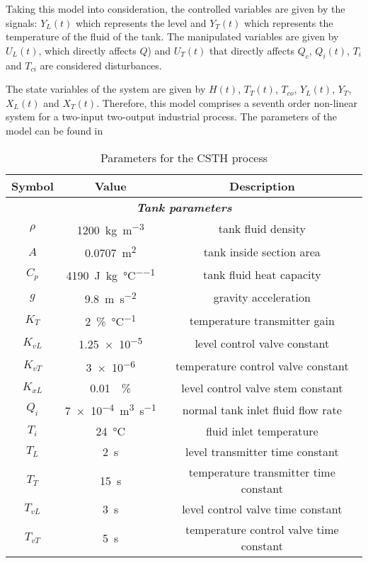 Taking this model into consideration, the controlled variables are given by the signals: $Y_L(t)$ which represents the level and $Y_T(t)$ which represents the temperature of the fluid of the tank. The manipulated variables are given by $U_L(t)$, which directly affects $Q$) and $U_T(t)$ that directly affects $Q_{c}$, $Q_i(t)$, $T_i$ and $T_{ci}$ are considered disturbances.

The state variables of the system are given by $H(t)$, $T_T(t)$, $T_{co}$, $Y_L(t)$, $Y_T$, $X_L(t)$ and $X_T(t)$. Therefore, this model comprises a seventh order non-linear system for a two-input two-output industrial process. The parameters of the model can be found in 
\begin{table}
	\centering
	\caption{Parameters for the CSTH process}
	\label{tab:ParametersCSTH}
	\begin{tabular}{ccc}
		\toprule
		\textbf{Symbol} & \textbf{Value} & \textbf{Description}\\
		\midrule
		\multicolumn{3}{c}{\textbf{\textit{Tank parameters}}}\\
		\midrule
		$\rho$ 		& \SI{1200}{\kilogram\per\meter\cubed} 			& tank fluid density\\
		$A$			& \SI{0.0707}{\square\meter}					& tank inside section area\\
		$C_p$		& \SI{4190}{\joule\per\kilogram\per\celsius}	& tank fluid heat capacity\\
		$g$			& \SI{9.8}{\meter\per\square\second}			& gravity acceleration\\
		$K_T$		& \SI{2}{\%\per\celsius}						& temperature transmitter gain\\
		$K_{vL}$	& \num{1.25e-5}									& level control valve constant\\
		$K_{vT}$	& \num{3e-6}									& temperature control valve constant\\
		$K_{xL}$	& \SI{0.01}{\per\%}								& level control valve stem constant\\
		$Q_i$		& \SI{7e-4}{\cubic\meter\per\second}			& normal tank inlet fluid flow rate\\
		$T_i$		& \SI{24}{\celsius}								& fluid inlet temperature\\
		$T_L$		& \SI{2}{\second}								& level transmitter time constant\\
		$T_T$		& \SI{15}{\second}								& temperature transmitter time constant\\
		$T_{vL}$	& \SI{3}{\second}								& level control valve time constant\\
		$T_{vT}$	& \SI{5}{\second}								& temperature control valve time constant\\

\end{tabular}
\end{table}
